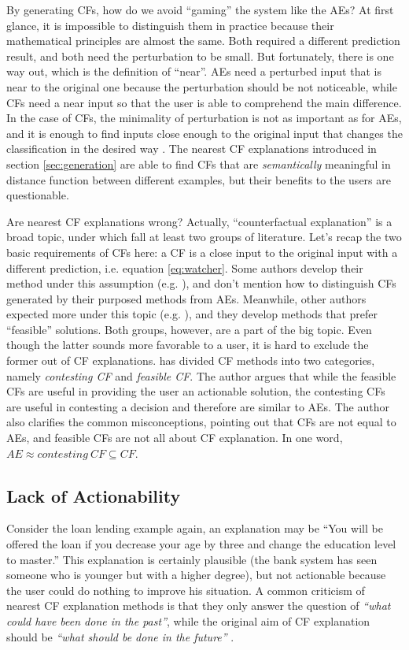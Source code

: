 By generating CFs, how do we avoid  ``gaming'' the system like the AEs? At first glance, it is impossible to distinguish them in practice because their mathematical principles are almost the same. Both required a different prediction result, and both need the perturbation to be small. But fortunately, there is one way out, which is the definition of ``near''. AEs need a perturbed input that is near to the original one because the perturbation should be not noticeable, while CFs need a near input so that the user is able to comprehend the main difference. In the case of CFs, the minimality of perturbation is not as important as for AEs, and it is enough to find inputs close enough to the original input that changes the classification in the desired way \cite{CFandAE}. The nearest CF explanations introduced in section \ref{sec:generation} are able to find CFs that are \emph{semantically} meaningful in distance function between different examples, but their benefits to the users are questionable.

Are nearest CF explanations wrong? Actually, ``counterfactual explanation'' is a broad topic, under which fall at least two groups of literature. Let's recap the two basic requirements of CFs here: a CF is a close input to the original input with a different prediction, i.e. equation \ref{eq:watcher}. Some authors develop their method under this assumption (e.g. \cite{certifai,watcher2017,DiCE}), and don't mention how to distinguish CFs generated by their purposed methods from AEs. Meanwhile, other authors expected more under this topic (e.g. \cite{prototype}), and they develop methods that prefer ``feasible'' solutions. Both groups, however, are a part of the big topic. Even though the latter sounds more favorable to a user, it is hard to exclude the former out of CF explanations. \citeauthor{CFandAE} \cite{CFandAE} has divided CF methods into two categories, namely \emph{contesting CF} and \emph{feasible CF}. The author argues that while the feasible CFs are useful in providing the user an actionable solution, the contesting CFs are useful in contesting a decision and therefore are similar to AEs. The author also clarifies the common misconceptions, pointing out that CFs are not equal to AEs, and feasible CFs are not all about CF explanation. In one word, $AE\approx contesting\ CF\subseteq CF$.
 \subsection{Lack of Actionability}
Consider the loan lending example again, an explanation may be ``You will be offered the loan if you decrease your age by three and change the education level to master.'' This explanation is certainly plausible (the bank system has seen someone who is younger but with a higher degree), but not actionable because the user could do nothing to improve his situation. A common criticism of nearest CF explanation methods is that they only answer the question of \emph{``what could have been done in the past''}, while the original aim of CF explanation should be \emph{``what should be done in the future''} \cite{algorithmicrecourse}.

